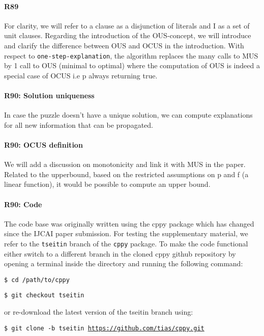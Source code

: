 \documentclass{article}
\begin{document}
\paragraph{R89} For clarity, we will refer to a clause as a disjunction of literals and I as a set of unit clauses. Regarding the introduction of the OUS-concept, we will introduce and clarify the difference between OUS and OCUS in the introduction. With respect to \texttt{one-step-explanation}, the algorithm replaces the many calls to MUS by 1 call to OUS (minimal to optimal) where the computation of OUS is indeed a special case of OCUS i.e p always returning true.

\paragraph{R90: Solution uniqueness} In case the puzzle doesn't have a unique solution, we can compute explanations for all new information that can be propagated.

\paragraph{R90: OCUS definition}  We will add a discussion on monotonicity and link it with MUS in the paper. 
Related to the upperbound, based on the restricted assumptions on p and f (a linear function), it would be possible to compute an upper bound.

\paragraph{R90: Code} The code base was originally written using the cppy package which has changed since the IJCAI paper submission. For testing the supplementary material, we refer to the \texttt{tseitin} branch of the \texttt{cppy} package. To make the code functional either switch to a different branch in the cloned cppy github repository by opening a terminal inside the directory and running the following command:

\texttt{\$ cd /path/to/cppy}

\texttt{\$ git checkout tseitin}

or re-download the latest version of the tseitin branch using:

\texttt{\$ git clone -b tseitin \url{https://github.com/tias/cppy.git}}
\end{document}

